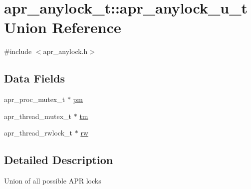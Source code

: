 \hypertarget{unionapr__anylock__t_1_1apr__anylock__u__t}{\section{apr\-\_\-anylock\-\_\-t\-:\-:apr\-\_\-anylock\-\_\-u\-\_\-t Union Reference}
\label{unionapr__anylock__t_1_1apr__anylock__u__t}
}


{\ttfamily \#include $<$apr\-\_\-anylock.\-h$>$}

\subsection*{Data Fields}
\begin{DoxyCompactItemize}
\item 
apr\-\_\-proc\-\_\-mutex\-\_\-t $\ast$ \hyperlink{unionapr__anylock__t_1_1apr__anylock__u__t_aeb1a5d1e7a4e326482983ea956caae42}{pm}
\item 
apr\-\_\-thread\-\_\-mutex\-\_\-t $\ast$ \hyperlink{unionapr__anylock__t_1_1apr__anylock__u__t_af08254c9ff8d2152276040037cd8ee53}{tm}
\item 
apr\-\_\-thread\-\_\-rwlock\-\_\-t $\ast$ \hyperlink{unionapr__anylock__t_1_1apr__anylock__u__t_a7d876bf9eda2835ba357a25c98b095b2}{rw}
\end{DoxyCompactItemize}


\subsection{Detailed Description}
Union of all possible A\-P\-R locks 

